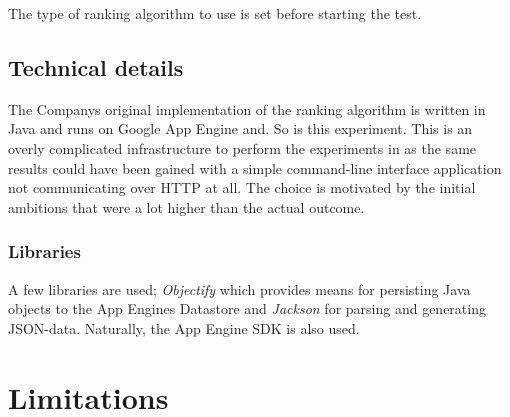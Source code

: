 The type of ranking algorithm to use is set before starting the test.

\subsection{Technical details}

The Companys original implementation of the ranking algorithm is written in Java and runs on Google App Engine and. So is this experiment. This is an overly complicated infrastructure to perform the experiments in as the same results could have been gained with a simple command-line interface application not communicating over HTTP at all. The choice is motivated by the initial ambitions that were a lot higher than the actual outcome.

\subsubsection{Libraries}

A few libraries are used; \emph{Objectify} which provides means for persisting Java objects to the App Engines Datastore
and \emph{Jackson} for parsing and generating JSON-data. Naturally, the App Engine SDK is also used.


\section{Limitations}


